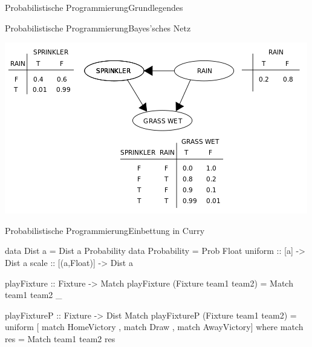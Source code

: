 \documentclass{beamer}
\begin{document}
\begin{frame}{Probabilistische Programmierung}{Grundlegendes}
\begin{minipage}{0.7\textwidth}
{}
\end{minipage}

\end{frame}


\begin{frame}{Probabilistische Programmierung}{Bayes'sches Netz}

\includegraphics[width=\textwidth]{images/bayes}

\end{frame}


\begin{frame}[fragile]{Probabilistische Programmierung}{Einbettung in Curry}

\begin{semiverbatim}
data Dist a = Dist a Probability
data Probability = Prob Float
uniform :: [a] -> Dist a
scale :: [(a,Float)] -> Dist a
\end{semiverbatim}
  
\begin{semiverbatim}
playFixture :: Fixture -> Match
playFixture (Fixture team1 team2) =
  Match team1 team2 _

playFixtureP :: Fixture -> Dist Match
playFixtureP (Fixture team1 team2) =
  uniform [ match HomeVictory
          , match Draw
          , match AwayVictory]
 where match res = Match team1 team2 res
\end{semiverbatim}

\end{frame}
\end{document}
